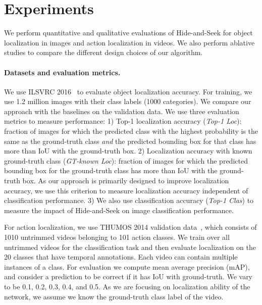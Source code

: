 \section{Experiments}\label{section:results}

We perform quantitative and qualitative evaluations of Hide-and-Seek for object localization in images and action localization in videos.  We also perform ablative studies to compare the different design choices of our algorithm.


\vspace{-10pt}
\paragraph{Datasets and evaluation metrics.} We use ILSVRC 2016~\cite{Russakovsky-IJCV2015} to evaluate object localization accuracy. For training, we use 1.2 million images with their class labels (1000 categories). We compare our approach with the baselines on the validation data. We use three evaluation metrics to measure performance: 1) Top-1 localization accuracy (\emph{Top-1 Loc}): fraction of images for which the predicted class with the highest probability is the same as the ground-truth class \emph{and} the predicted bounding box for that class has more than  IoU with the ground-truth box. 2) Localization accuracy with known ground-truth class (\emph{GT-known Loc}): fraction of images for which the predicted bounding box for the ground-truth class has more than  IoU with the ground-truth box.  As our approach is primarily designed to improve localization accuracy, we use this criterion to measure localization accuracy independent of classification performance. 3) We also use classification accuracy (\emph{Top-1 Clas}) to measure the impact of Hide-and-Seek on image classification performance.

For action localization, we use THUMOS 2014 validation data~\cite{jiang-14}, which consists of 1010 untrimmed videos belonging to 101 action classes. We train over all untrimmed videos for the classification task and then evaluate localization on the 20 classes that have temporal annotations. Each video can contain multiple instances of a class. For evaluation we compute mean average precision (mAP), and consider a prediction to be correct if it has IoU  with ground-truth. We vary  to be 0.1, 0.2, 0.3, 0.4, and 0.5. As we are focusing on localization ability of the network, we assume we know the ground-truth class label of the video.


\vspace{-10pt}
